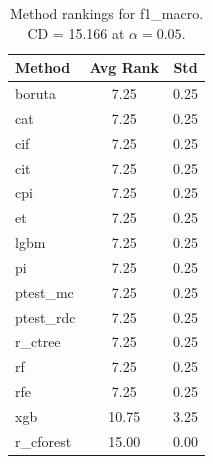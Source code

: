 \begin{table}[h]
\centering
\caption{Method rankings for f1_macro. CD = 15.166 at $\alpha=0.05$.}
\label{tab:ranks_f1_macro}
\begin{tabular}{lcc}
\toprule
Method & Avg Rank & Std \\
\midrule
boruta & 7.25 & 0.25 \\
cat & 7.25 & 0.25 \\
cif & 7.25 & 0.25 \\
cit & 7.25 & 0.25 \\
cpi & 7.25 & 0.25 \\
et & 7.25 & 0.25 \\
lgbm & 7.25 & 0.25 \\
pi & 7.25 & 0.25 \\
ptest_mc & 7.25 & 0.25 \\
ptest_rdc & 7.25 & 0.25 \\
r_ctree & 7.25 & 0.25 \\
rf & 7.25 & 0.25 \\
rfe & 7.25 & 0.25 \\
xgb & 10.75 & 3.25 \\
r_cforest & 15.00 & 0.00 \\
\bottomrule
\end{tabular}
\end{table}